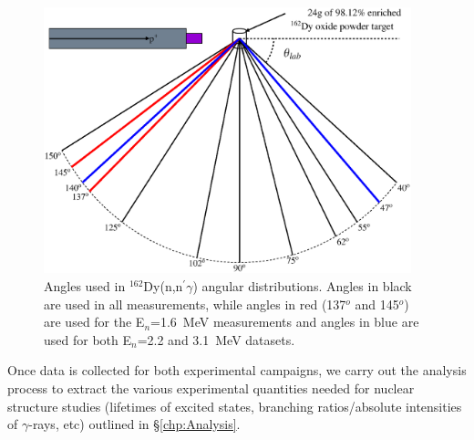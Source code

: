 \begin{figure}[h!]
\centering
\includegraphics[width=0.95\textwidth]{figures/SciDraw_angular_distributions.eps}
\caption{Angles used in $^{162}$Dy(n,n$^\prime\gamma$) angular distributions. Angles in black are used in all measurements, while angles in red (137$^o$ and 145$^o$) are used for the E$_n$=1.6~MeV measurements and angles in blue are used for both E$_n$=2.2 and 3.1~MeV datasets. \label{fig:SciDraw_angular_distributions}}
\end{figure}

Once data is collected for both experimental campaigns, we carry out the analysis process to extract the various experimental quantities needed for nuclear structure studies (lifetimes of excited states, branching ratios/absolute intensities of $\gamma$-rays, etc) outlined in \S \ref{chp:Analysis}.